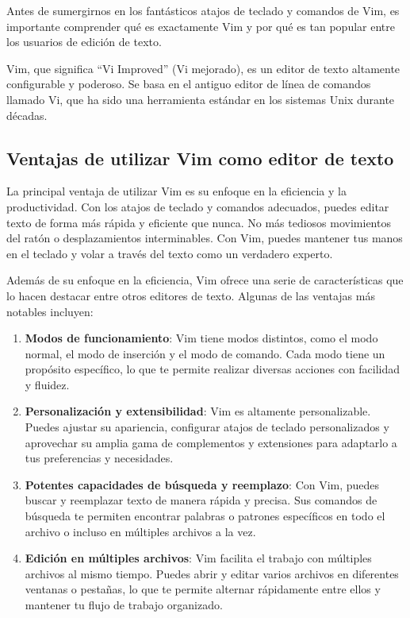 \documentclass[
  a4paper,
]{article}
\begin{document}
Antes de sumergirnos en los fantásticos atajos de teclado y comandos de
Vim, es importante comprender qué es exactamente Vim y por qué es tan
popular entre los usuarios de edición de texto.

Vim, que significa ``Vi Improved'' (Vi mejorado), es un editor de texto
altamente configurable y poderoso. Se basa en el antiguo editor de línea
de comandos llamado Vi, que ha sido una herramienta estándar en los
sistemas Unix durante décadas.

\subsection{Ventajas de utilizar Vim como editor de
texto}\label{ventajas-de-utilizar-vim-como-editor-de-texto}

La principal ventaja de utilizar Vim es su enfoque en la eficiencia y la
productividad. Con los atajos de teclado y comandos adecuados, puedes
editar texto de forma más rápida y eficiente que nunca. No más tediosos
movimientos del ratón o desplazamientos interminables. Con Vim, puedes
mantener tus manos en el teclado y volar a través del texto como un
verdadero experto.

Además de su enfoque en la eficiencia, Vim ofrece una serie de
características que lo hacen destacar entre otros editores de texto.
Algunas de las ventajas más notables incluyen:

\begin{enumerate}
\def\labelenumi{\arabic{enumi}.}
\item
  \textbf{Modos de funcionamiento}: Vim tiene modos distintos, como el
  modo normal, el modo de inserción y el modo de comando. Cada modo
  tiene un propósito específico, lo que te permite realizar diversas
  acciones con facilidad y fluidez.
\item
  \textbf{Personalización y extensibilidad}: Vim es altamente
  personalizable. Puedes ajustar su apariencia, configurar atajos de
  teclado personalizados y aprovechar su amplia gama de complementos y
  extensiones para adaptarlo a tus preferencias y necesidades.
\item
  \textbf{Potentes capacidades de búsqueda y reemplazo}: Con Vim, puedes
  buscar y reemplazar texto de manera rápida y precisa. Sus comandos de
  búsqueda te permiten encontrar palabras o patrones específicos en todo
  el archivo o incluso en múltiples archivos a la vez.
\item
  \textbf{Edición en múltiples archivos}: Vim facilita el trabajo con
  múltiples archivos al mismo tiempo. Puedes abrir y editar varios
  archivos en diferentes ventanas o pestañas, lo que te permite alternar
  rápidamente entre ellos y mantener tu flujo de trabajo organizado.
\end{enumerate}
\end{document}
